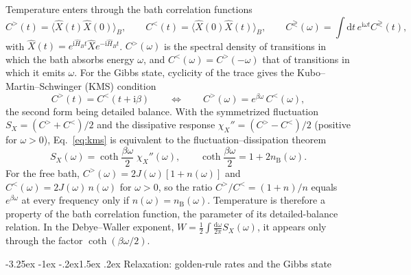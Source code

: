 \documentclass[10pt,a4paper]{article}
\makeatletter
\renewcommand{\subsection}{\@startsection{subsection}{2}{\z@}%
  {-3.25ex \@plus -1ex \@minus -.2ex}{1.5ex \@plus .2ex}%
  {\normalfont\fontsize{15.5pt}{19pt}\selectfont\bfseries}}
\newcommand{\dd}{\mathrm{d}}
\newcommand{\ii}{\mathrm{i}}
\makeatother
\begin{document}
Temperature enters through the bath correlation functions
\begin{equation}
  C^>(t) = \langle \hat X(t) \hat X(0) \rangle_B ,
  \qquad
  C^<(t) = \langle \hat X(0) \hat X(t) \rangle_B ,
  \qquad
  C^\gtrless(\omega) = \int \dd t \, e^{\ii\omega t} C^\gtrless(t) ,
  \label{eq:bath-corr}
\end{equation}
with $ \hat X(t) = e^{\ii\hat H_B t} \hat X e^{-\ii\hat H_B t} $.
$ C^>(\omega) $ is the spectral density of transitions in which the bath absorbs energy $ \omega $, and $ C^<(\omega) = C^>(-\omega) $ that of transitions in which it emits $ \omega $.
For the Gibbs state, cyclicity of the trace gives the Kubo--Martin--Schwinger (KMS) condition
\begin{equation}
  C^>(t) = C^<(t + \ii\beta)
  \qquad\Longleftrightarrow\qquad
  C^>(\omega) = e^{\beta\omega} \, C^<(\omega) ,
  \label{eq:kms}
\end{equation}
the second form being detailed balance.
With the symmetrized fluctuation $ S_X = (C^> + C^<)/2 $ and the dissipative response $ \chi_X'' = (C^> - C^<)/2 $ (positive for $ \omega > 0 $), Eq.~\eqref{eq:kms} is equivalent to the fluctuation--dissipation theorem
\begin{equation}
  S_X(\omega) = \coth\frac{\beta\omega}{2} \; \chi_X''(\omega) ,
  \qquad
  \coth\frac{\beta\omega}{2} = 1 + 2 n_{\mathrm B}(\omega) .
  \label{eq:fdt}
\end{equation}
For the free bath, $ C^>(\omega) = 2J(\omega)[1 + n(\omega)] $ and $ C^<(\omega) = 2J(\omega)\, n(\omega) $ for $ \omega > 0 $, so the ratio $ C^>/C^< = (1+n)/n $ equals $ e^{\beta\omega} $ at every frequency only if $ n(\omega) = n_{\mathrm B}(\omega) $.
Temperature is therefore a property of the bath correlation function, the parameter of its detailed-balance relation.
In the Debye--Waller exponent, $ W = \frac12 \int \frac{\dd\omega}{2\pi} S_X(\omega) $, it appears only through the factor $ \coth(\beta\omega/2) $.

\subsection{Relaxation: golden-rule rates and the Gibbs state}
\label{sec:master}
\end{document}
